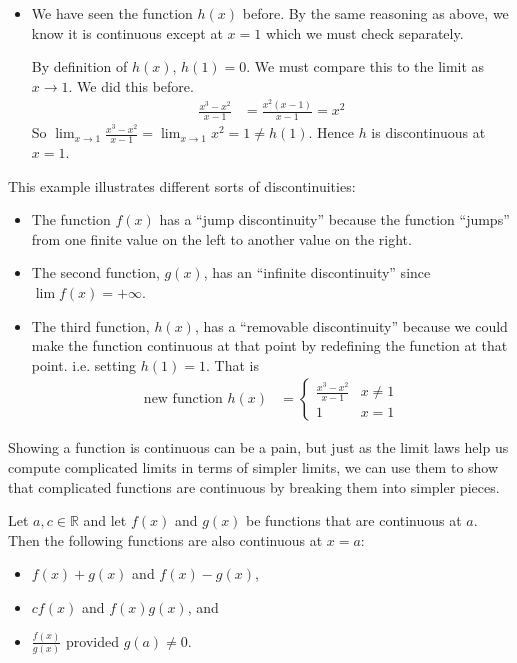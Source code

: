 \begin{eg}
\begin{itemize}
\item We have seen the function $h(x)$ before. By the same reasoning as
above, we know it is continuous except at $x=1$ which we must check separately.

By definition of $h(x)$, $h(1) = 0$. We must compare this to the limit as $x
\to 1$. We did this before.
\begin{align*}
	\frac{x^3-x^2}{x-1} &= \frac{x^2(x-1)}{x-1} = x^2
\end{align*}
So $\lim_{x \to 1} \frac{x^3-x^2}{x-1} = \lim_{x \to 1} x^2 
= 1\neq h(1)$. Hence $h$
is discontinuous at $x=1$.
\end{itemize}
\end{eg}

This example illustrates different sorts of discontinuities:
\begin{itemize}
\item The function $f(x)$ has a ``jump discontinuity'' because the function
``jumps'' from one finite value on the left to another value on the right.
\item The second function, $g(x)$, has an ``infinite discontinuity'' since
$\lim f(x) =+\infty$.
\item The third function, $h(x)$, has a ``removable discontinuity'' because we
could make the function continuous at that point by redefining the function at
that point. i.e. setting $h(1)=1$. That is
\begin{align*}
  \text{new function }h(x) &= \begin{cases}
    \frac{x^3-x^2}{x-1} & x\neq 1\\
    1 & x=1
    \end{cases}
\end{align*}
\end{itemize}


Showing a function is continuous can be a pain, but just as the limit laws help
us compute complicated limits in terms of simpler limits, we can use them to
show that complicated functions are continuous by breaking them into simpler
pieces.
\begin{theorem}\label{thm arith cont}
  Let $a,c \in \mathbb{R}$ and let $f(x)$ and $g(x)$ be functions that are
continuous at $a$. Then the following functions are also continuous at $x=a$:
\begin{itemize}
 \item $f(x) + g(x)$ and $f(x) - g(x)$,
 \item $c f(x)$ and $f(x) g(x)$, and
 \item $\frac{f(x)}{g(x)}$ provided $g(a) \neq 0$.
\end{itemize}
\end{theorem}

